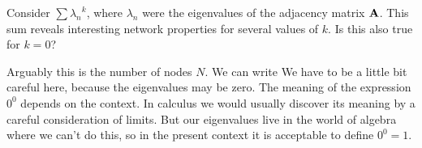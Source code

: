 Consider $\sum {\lambda_n}^k$,  where $\lambda_n$ were the eigenvalues of the adjacency matrix $\bf A$. This sum reveals interesting network properties for several values of $k$. Is this also true for $k=0$? 

\solution
Arguably this is the number of nodes $N$. We can write 
We have to be a little bit careful here, because the eigenvalues may be zero. 
The meaning of the expression $0^0$ depends on the context. In calculus we would usually discover its meaning by a careful consideration of limits. But our eigenvalues live in the world of algebra where we can't do this, so in the present context it is acceptable to define $0^0=1$.  
